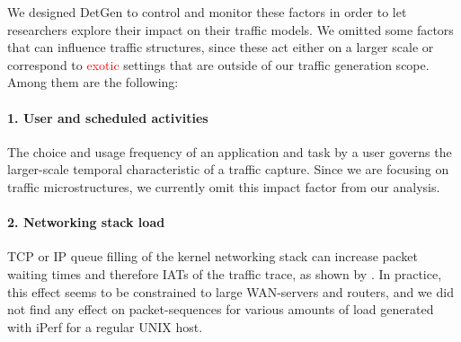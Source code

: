 \documentclass[runningheads]{llncs}
\begin{document}






\vspace{0.3cm}
We designed DetGen to control and monitor these factors in order to let researchers explore their impact on their traffic models. We omitted some factors that can influence traffic structures, since these act either on a larger scale or correspond to \textcolor{red}{exotic} settings that are outside of our traffic generation scope. Among them are the following:

\paragraph{1. User and scheduled activities}
The choice and usage frequency of an application and task by a user governs the larger-scale temporal characteristic of a traffic capture. Since we are focusing on traffic microstructures, we currently omit this impact factor from our analysis. 

\paragraph{2. Networking stack load}
TCP or IP queue filling of the kernel networking stack can increase packet waiting times and therefore IATs of the traffic trace, as shown by \cite{sequeira2013influence}. In practice, this effect seems to be constrained to large WAN-servers and routers, and we did not find any effect on packet-sequences for various amounts of load generated with iPerf for a regular UNIX host.


\end{document}
